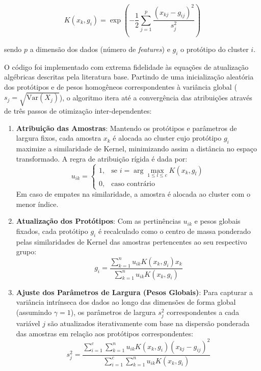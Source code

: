 \documentclass[12pt,a4paper]{article}
\begin{document}
\begin{equation}
    K(x_k, g_i) = \exp\left( -\frac{1}{2} \sum_{j=1}^p \frac{(x_{kj} - g_{ij})^2}{s_j^2} \right)
\end{equation}

sendo $p$ a dimensão dos dados (número de \textit{features}) e $g_i$ o protótipo do cluster $i$.

O código foi implementado com extrema fidelidade às equações de atualização algébricas descritas pela literatura base. Partindo de uma inicialização aleatória dos protótipos e de pesos homogêneos correspondentes à variância global ($s_j = \sqrt{\text{Var}(X_j)}$), o algoritmo itera até a convergência das atribuições através de três passos de otimização inter-dependentes:

\begin{enumerate}
    \item \textbf{Atribuição das Amostras}: Mantendo os protótipos e parâmetros de largura fixos, cada amostra $x_k$ é alocada ao cluster cujo protótipo $g_i$ maximize a similaridade de Kernel, minimizando assim a distância no espaço transformado. A regra de atribuição rígida é dada por:
    \begin{equation}
        u_{ik} = 
        \begin{cases} 
            1, & \text{se } i = \arg\max_{1 \le l \le c} K(x_k, g_l) \\
            0, & \text{caso contrário}
        \end{cases}
    \end{equation}
    Em caso de empates na similaridade, a amostra é alocada ao cluster com o menor índice.

    \item \textbf{Atualização dos Protótipos}: Com as pertinências $u_{ik}$ e pesos globais fixados, cada protótipo $g_i$ é recalculado como o centro de massa ponderado pelas similaridades de Kernel das amostras pertencentes ao seu respectivo grupo:
    \begin{equation}
        g_i = \frac{\sum_{k=1}^n u_{ik} K(x_k, g_i) x_k}{\sum_{k=1}^n u_{ik} K(x_k, g_i)}
    \end{equation}
    
    \item \textbf{Ajuste dos Parâmetros de Largura (Pesos Globais)}: Para capturar a variância intrínseca dos dados ao longo das dimensões de forma global (assumindo $\gamma = 1$), os parâmetros de largura $s_j^2$ correspondentes a cada variável $j$ são atualizados iterativamente com base na dispersão ponderada das amostras em relação aos protótipos correspondentes:
    \begin{equation}
        s_j^2 = \frac{\sum_{i=1}^c \sum_{k=1}^n u_{ik} K(x_k, g_i) (x_{kj} - g_{ij})^2}{\sum_{i=1}^c \sum_{k=1}^n u_{ik} K(x_k, g_i)}
    \end{equation}
\end{enumerate}
\end{document}
